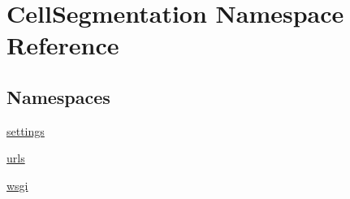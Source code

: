 \hypertarget{namespace_cell_segmentation}{}\section{Cell\+Segmentation Namespace Reference}
\label{namespace_cell_segmentation}
\subsection*{Namespaces}
\begin{DoxyCompactItemize}
\item 
 \mbox{\hyperlink{namespace_cell_segmentation_1_1settings}{settings}}
\item 
 \mbox{\hyperlink{namespace_cell_segmentation_1_1urls}{urls}}
\item 
 \mbox{\hyperlink{namespace_cell_segmentation_1_1wsgi}{wsgi}}
\end{DoxyCompactItemize}
